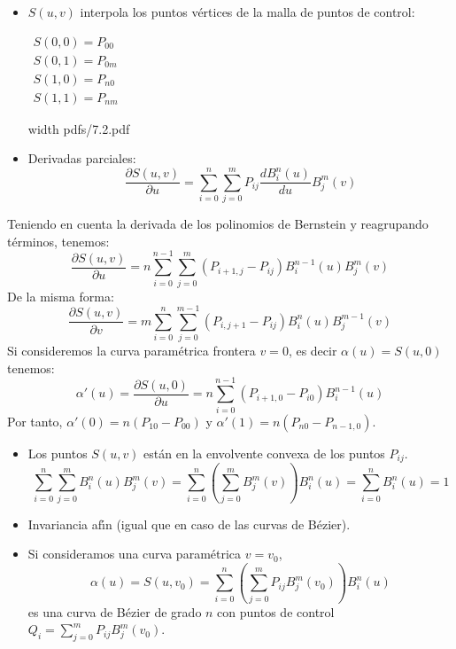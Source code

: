 \documentclass[twoside]{report}
\newcommand{\colocapdf}[2]{\quad\pdfimage width #2 {pdfs/#1.pdf}}
\begin{document}
\begin{itemize}
\item $S(u,v)$ interpola los puntos v\'{e}rtices de la malla de puntos de control:

\begin{center}


\end{center}
\begin{minipage}{.3\textwidth}
$\begin{array}{c} S(0,0)=P_{00}\\ S(0,1)=P_{0m}\\
S(1,0)=P_{n0}\\ S(1,1)=P_{nm}
\end{array}$
\end{minipage} \quad
\begin{minipage}{.3\textwidth}\colocapdf{7.2}{\textwidth}
\end{minipage}

\item Derivadas parciales:
$$\frac{\partial S(u,v)}{\partial u}=\sum_{i=0}^n \sum_{j=0}^m P_{ij} \frac{dB_i^n(u)}{d u} B_j^m(v)$$
\end{itemize}

Teniendo en cuenta la derivada de los polinomios de Bernstein y reagrupando t\'{e}rminos, tenemos:
$$\frac{\partial S(u,v)}{\partial u}=n\sum_{i=0}^{n-1} \sum_{j=0}^m (P_{i+1,j}-P_{ij}) B_i^{n-1}(u) B_j^m(v)$$
De la misma forma:
$$\frac{\partial S(u,v)}{\partial v}=m\sum_{i=0}^{n} \sum_{j=0}^{m-1} (P_{i,j+1}-P_{ij}) B_i^{n}(u) B_j^{m-1}(v)$$
Si consideremos la curva param\'{e}trica frontera $v=0$, es decir $\alpha(u)=S(u,0)$ tenemos:
$$\alpha'(u)=\frac{\partial S(u,0)}{\partial u}=n\sum_{i=0}^{n-1} (P_{i+1,0}-P_{i0}) B_i^{n-1}(u)$$
Por tanto, $\alpha'(0)=n(P_{10}-P_{00})$ y $\alpha'(1)=n(P_{n0}-P_{n-1,0}).$

\begin{itemize}
\item Los puntos $S(u,v)$ est\'{a}n en la envolvente convexa de los puntos $P_{ij}$.
$$\sum_{i=0}^{n} \sum_{j=0}^m B_i^{n}(u) B_j^m(v)= \sum_{i=0}^{n}\left( \sum_{j=0}^m B_j^m(v) \right) B_i^{n}(u)=\sum_{i=0}^{n} B_i^{n}(u)=1$$
\item Invariancia af\'{\i}n (igual que en caso de las curvas de B\'{e}zier).
\item Si consideramos una curva param\'{e}trica $v=v_0$,
$$\alpha(u)=S(u,v_0)=\sum_{i=0}^n \left( \sum_{j=0}^m P_{ij} B_j^m(v_0) \right) B_i^n(u)$$
es una curva de B\'{e}zier de grado $n$ con puntos de control $Q_i=\sum_{j=0}^m P_{ij} B_j^m(v_0).$
\end{itemize}
\end{document}
